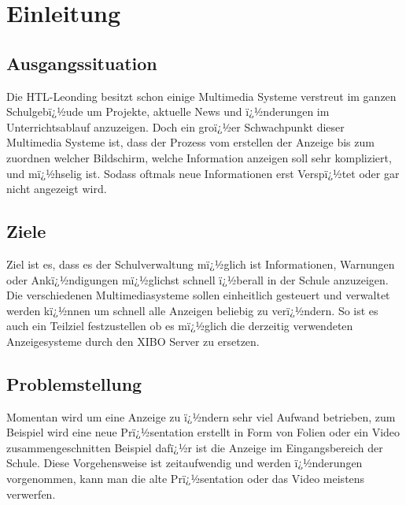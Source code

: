 \chapter{Einleitung}
\section{Ausgangssituation}
Die HTL-Leonding besitzt schon einige Multimedia Systeme verstreut im ganzen Schulgebï¿½ude um Projekte, aktuelle News und ï¿½nderungen im Unterrichtsablauf anzuzeigen. Doch ein groï¿½er Schwachpunkt dieser Multimedia Systeme ist, dass der Prozess vom erstellen der Anzeige bis zum zuordnen welcher Bildschirm, welche Information anzeigen soll sehr kompliziert, und mï¿½hselig ist. Sodass oftmals neue Informationen erst Verspï¿½tet oder gar nicht angezeigt wird. 

\section{Ziele}
Ziel ist es, dass es der Schulverwaltung mï¿½glich ist Informationen, Warnungen oder Ankï¿½ndigungen mï¿½glichst schnell ï¿½berall in der Schule anzuzeigen. Die verschiedenen Multimediasysteme sollen einheitlich gesteuert und verwaltet werden kï¿½nnen um schnell alle Anzeigen beliebig zu verï¿½ndern. So ist es auch ein Teilziel festzustellen ob es mï¿½glich die derzeitig verwendeten Anzeigesysteme durch den XIBO Server zu ersetzen.

\section{Problemstellung}
Momentan wird um eine Anzeige zu ï¿½ndern sehr viel Aufwand betrieben, zum Beispiel wird eine neue Prï¿½sentation erstellt in Form von Folien oder ein Video zusammengeschnitten Beispiel dafï¿½r ist die Anzeige im Eingangsbereich der Schule. Diese Vorgehensweise ist zeitaufwendig und werden ï¿½nderungen vorgenommen, kann man die alte Prï¿½sentation oder das Video meistens verwerfen.

